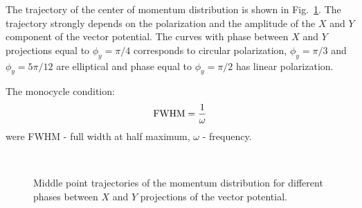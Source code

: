 The trajectory of the center of momentum distribution is shown in Fig.~\ref{fig:Pulse_p_3}. The trajectory strongly depends on the polarization and the amplitude of the $X$ and $Y$ component of the vector potential. The curves with phase between $X$ and $Y$ projections equal to $\phi_y=\pi /4$ corresponds to circular polarization, $\phi_y=\pi /3$ and $\phi_y=5\pi /12$ are elliptical and phase equal to $\phi_y=\pi /2$ has linear polarization.

The monocycle condition:
\begin{equation}
\text{FWHM}={1 \over \omega}\\
\label{eq:monocycle_condition}
\end{equation}
were FWHM - full width at half maximum, $\omega$ - frequency.
\begin{figure}[h!]
 \\
\caption{Middle point trajectories of the momentum distribution for different phases between $X$ and $Y$ projections of the vector potential.}
\label{fig:Pulse_p_3}
\end{figure}

